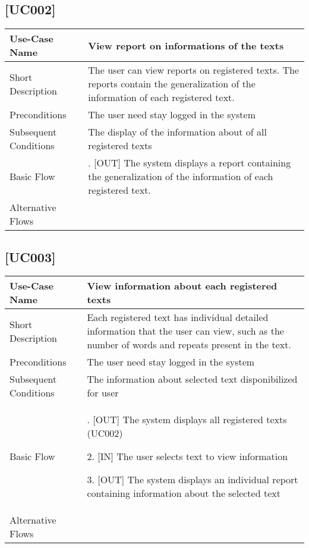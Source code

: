 \documentclass[11pt, twoside, a4paper]{book}
\begin{document}
			\subsection{[UC002]}			
				\begin{tabular}{|>{\centering\arraybackslash}m{3cm} |>{\arraybackslash}m{9cm}|}										   \hline
					Use-Case Name 			& [UC002] View report on informations of the texts																	\\ \hline
					Short Description  		& The user can view reports on registered texts. The reports contain the generalization of the information of each registered text.    	\\ \hline	
					Preconditions  			& The user need stay logged in the system      														\\ \hline
					Subsequent Conditions	& The display of the information about of all registered texts																	\\ \hline
					Basic Flow  			& 1. [OUT] The system displays a report containing the generalization of the information of each registered text.	\\ \hline
					
				Alternative Flows  		&    																								\\ \hline
			\end{tabular}

			\subsection{[UC003]}			
				\begin{tabular}{|>{\centering\arraybackslash}m{3cm} |>{\arraybackslash}m{9cm}|}										   			   									   \hline
					Use-Case Name 			& [UC003] View information about each registered texts																								\\ \hline
					Short Description  		& Each registered text has individual detailed information that the user can view, such as the number of words and repeats present in the text.    	\\ \hline	
					Preconditions  			& The user need stay logged in the system      																										\\ \hline
					Subsequent Conditions	& The information about selected text disponibilized for user																						\\ \hline
					Basic Flow  			& 	1. [OUT] The system displays all registered texts	(UC002)													
											  
												2. [IN] The user selects text to view information														
											  
												3. [OUT] The system displays an individual report containing information about the selected text														\\ \hline
				Alternative Flows  		&       																																				\\ \hline
			\end{tabular}
\end{document}
